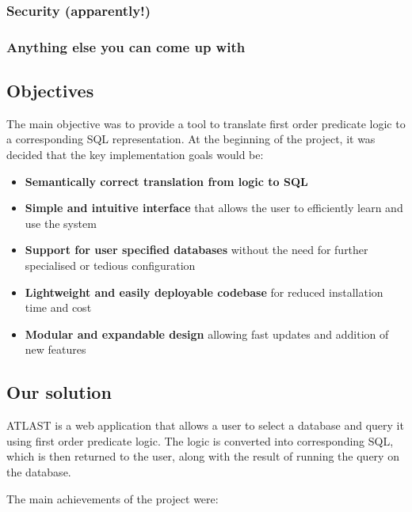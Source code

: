 \documentclass[a4paper, 11pt]{article}
\begin{document}
    \subsubsection{Security (apparently!)}

    \subsubsection{Anything else you can come up with}

  \subsection{Objectives}
    The main objective was to provide a tool to translate first order predicate
    logic to a corresponding SQL representation. At the beginning of the
    project, it was decided that the key implementation goals would be:

    \begin{itemize}
      \item \textbf{Semantically correct translation from logic to SQL}

      \item \textbf{Simple and intuitive interface} that allows the user to
      efficiently learn and use the system

      \item \textbf{Support for user specified databases} without the need for
      further specialised or tedious configuration

      \item \textbf{Lightweight and easily deployable codebase} for reduced
      installation time and cost

      \item \textbf{Modular and expandable design} allowing fast updates and
      addition of new features
    \end{itemize}

  \subsection{Our solution}
    ATLAST is a web application that allows a user to select a database
    and query it using first order predicate logic. The logic is converted
    into corresponding SQL, which is then returned to the user, along with the
    result of running the query on the database.  
    
    The main achievements of the project were:
\end{document}
